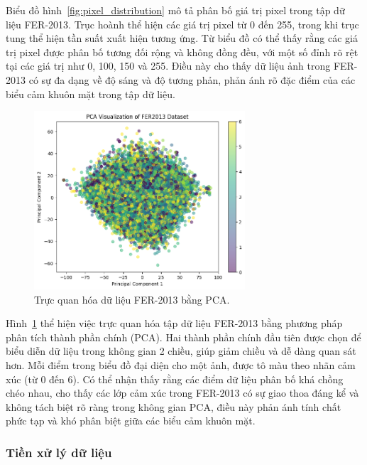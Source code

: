 Biểu đồ hình~\ref{fig:pixel_distribution} mô tả phân bố giá trị pixel trong tập dữ liệu FER-2013. Trục hoành thể hiện các giá trị pixel từ 0 đến 255, trong khi trục tung thể hiện tần suất xuất hiện tương ứng. Từ biểu đồ có thể thấy rằng các giá trị pixel được phân bố tương đối rộng và không đồng đều, với một số đỉnh rõ rệt tại các giá trị như 0, 100, 150 và 255. Điều này cho thấy dữ liệu ảnh trong FER-2013 có sự đa dạng về độ sáng và độ tương phản, phản ánh rõ đặc điểm của các biểu cảm khuôn mặt trong tập dữ liệu.

\begin{figure}[H]
    \centering
    \includegraphics[width=0.7\textwidth]{img/PCA.png} %
    \caption{Trực quan hóa dữ liệu FER-2013 bằng PCA.}
    \label{fig:pca_visualization}
    \par\vspace{0.5cm} %
\end{figure}

Hình~\ref{fig:pca_visualization} thể hiện việc trực quan hóa tập dữ liệu FER-2013 bằng phương pháp phân tích thành phần chính (PCA). Hai thành phần chính đầu tiên được chọn để biểu diễn dữ liệu trong không gian 2 chiều, giúp giảm chiều và dễ dàng quan sát hơn. Mỗi điểm trong biểu đồ đại diện cho một ảnh, được tô màu theo nhãn cảm xúc (từ 0 đến 6). Có thể nhận thấy rằng các điểm dữ liệu phân bố khá chồng chéo nhau, cho thấy các lớp cảm xúc trong FER-2013 có sự giao thoa đáng kể và không tách biệt rõ ràng trong không gian PCA, điều này phản ánh tính chất phức tạp và khó phân biệt giữa các biểu cảm khuôn mặt.


\subsubsection{Tiền xử lý dữ liệu}

